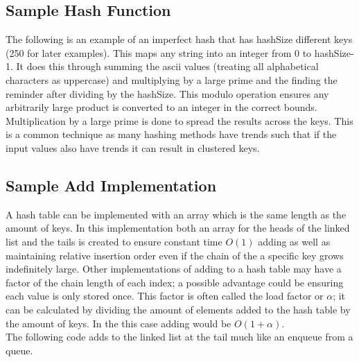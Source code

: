 \documentclass[letterpaper, 10pt]{article}
\begin{document}
\subsection{Sample Hash Function}
The following is an example of an imperfect hash that has hashSize different keys (250 for later examples). This maps any string
into an integer from 0 to hashSize-1. It does this through summing the ascii values (treating all alphabetical characters as uppercase)
and multiplying by a large prime and the finding the reminder after dividing by the hashSize. This modulo operation ensures any arbitrarily
large product is converted to an integer in the correct bounds. Multiplication by a large prime is done to spread the results across the keys.
This is a common technique as many hashing methods have trends such that if the input values also have trends
it can result in clustered keys.


\subsection{Sample Add Implementation}
A hash table can be implemented with an array which is the same length as the amount of keys. In this implementation
both an array for the heads of the linked list and the tails is created to ensure constant time $O(1)$ adding as well as 
maintaining relative insertion order even if
the chain of the a specific key grows indefinitely large. Other implementations of adding to a hash table may have a 
factor of the chain length of each index; a possible advantage could be ensuring each value is only stored once.
This factor is often called the load factor or $\alpha$; it can
be calculated by dividing the amount of elements added to the hash table by the amount of keys.
In the this case adding would be $O(1 + \alpha)$. \\
\newline
\noindent
\newpage
The following code adds to the linked list at the tail much like an enqueue from a queue.


\end{document}

